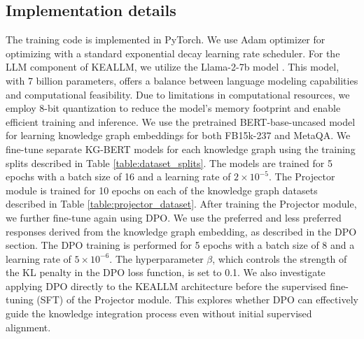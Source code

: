 \subsection{Implementation details}
The training code is implemented in PyTorch\cite{paszke2019pytorch}. We use Adam optimizer\cite{DBLP:journals/corr/KingmaB14} for optimizing with a standard exponential decay learning rate scheduler. For the LLM component of KEALLM, we utilize the Llama-2-7b model \cite{touvron2023llama}. This model, with 7 billion parameters, offers a balance between language modeling capabilities and computational feasibility. Due to limitations in computational resources, we employ 8-bit quantization to reduce the model's memory footprint and enable efficient training and inference. We use the pretrained BERT-base-uncased model for learning knowledge graph embeddings for both FB15k-237 and MetaQA. We fine-tune separate KG-BERT models for each knowledge graph using the training splits described in Table \ref{table:dataset_splits}. The models are trained for 5 epochs with a batch size of 16 and a learning rate of $2 \times 10^{-5}$. The Projector module is trained for 10 epochs on each of the knowledge graph datasets described in Table \ref{table:projector_dataset}. After training the Projector module, we further fine-tune again using DPO. We use the preferred and less preferred responses derived from the knowledge graph embedding, as described in the DPO section. The DPO training is performed for 5 epochs with a batch size of 8 and a learning rate of $5 \times 10^{-6}$. The hyperparameter $\beta$, which controls the strength of the KL penalty in the DPO loss function, is set to 0.1. We also investigate applying DPO directly to the KEALLM architecture before the supervised fine-tuning (SFT) of the Projector module. This explores whether DPO can effectively guide the knowledge integration process even without initial supervised alignment.